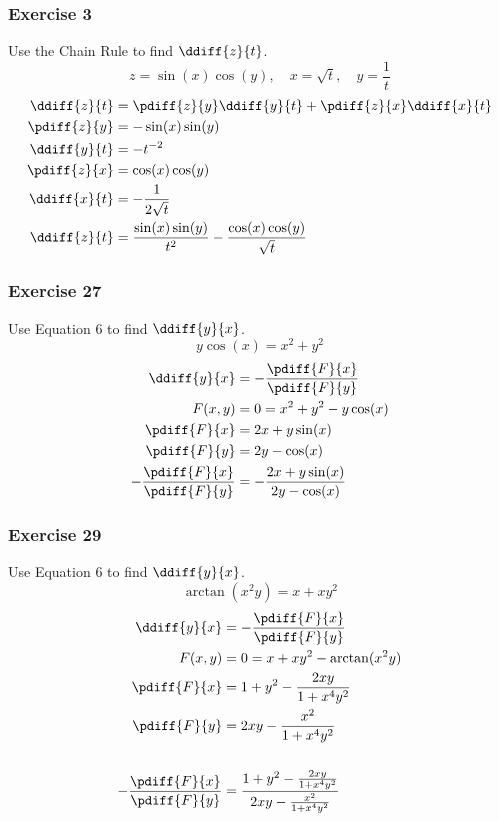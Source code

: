 \documentclass{math}
\begin{document}
\subsubsection*{Exercise 3}
Use the Chain Rule to find \( \ddiff{z}{t} \).
\[ z = \sin(x)\cos(y), \quad x = \sqrt{t}, \quad y = \frac{1}{t} \]
\begin{align*}
  \ddiff{z}{t} &= \pdiff{z}{y}\ddiff{y}{t}+\pdiff{z}{x}\ddiff{x}{t} \\
  \pdiff{z}{y} &= -\sin(x)\sin(y) \\
  \ddiff{y}{t} &= -t^{-2} \\
  \pdiff{z}{x} &= \cos(x)\cos(y) \\
  \ddiff{x}{t} &= -\frac{1}{2\sqrt{t}} \\
  \ddiff{z}{t} &= \frac{\sin(x)\sin(y)}{t^2}-\frac{\cos(x)\cos(y)}{\sqrt{t}}
\end{align*}

\subsubsection*{Exercise 27}
Use Equation 6 to find \( \ddiff{y}{x} \).
\[ y\cos(x) = x^2+y^2 \]
\begin{align*}
  \ddiff{y}{x} &= -\frac{\pdiff{F}{x}}{\pdiff{F}{y}} \\
  F(x,y) &= 0 = x^2+y^2-y\cos(x) \\
  \pdiff{F}{x} &= 2x+y\sin(x) \\
  \pdiff{F}{y} &= 2y-\cos(x) \\
  -\frac{\pdiff{F}{x}}{\pdiff{F}{y}} &= -\frac{2x+y\sin(x)}{2y-\cos(x)}
\end{align*}

\subsubsection*{Exercise 29}
Use Equation 6 to find \( \ddiff{y}{x} \).
\[ \arctan(x^2y) = x+xy^2 \]
\begin{align*}
  \ddiff{y}{x} &= -\frac{\pdiff{F}{x}}{\pdiff{F}{y}} \\
  F(x,y) &= 0 = x+xy^2-\arctan(x^2y) \\
  \pdiff{F}{x} &= 1+y^2-\frac{2xy}{1+x^4y^2} \\
  \pdiff{F}{y} &= 2xy-\frac{x^2}{1+x^4y^2} \\ \\
  -\frac{\pdiff{F}{x}}{\pdiff{F}{y}} &=
    \frac{1+y^2-\frac{2xy}{1+x^4y^2}}{2xy-\frac{x^2}{1+x^4y^2}}
\end{align*}
\end{document}
